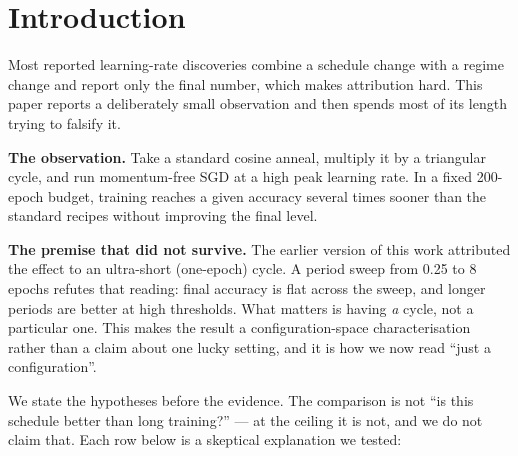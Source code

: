 \documentclass[11pt,a4paper]{article}
\begin{document}
\section{Introduction}
Most reported learning-rate discoveries combine a schedule change with a regime change and report only the final number, which makes attribution hard. This paper reports a deliberately small observation and then spends most of its length trying to falsify it.

\textbf{The observation.} Take a standard cosine anneal, multiply it by a triangular cycle, and run momentum-free SGD at a high peak learning rate. In a fixed 200-epoch budget, training reaches a given accuracy several times sooner than the standard recipes without improving the final level.

\textbf{The premise that did not survive.} The earlier version of this work attributed the effect to an ultra-short (one-epoch) cycle. A period sweep from 0.25 to 8 epochs refutes that reading: final accuracy is flat across the sweep, and longer periods are better at high thresholds. What matters is having \textit{a} cycle, not a particular one. This makes the result a configuration-space characterisation rather than a claim about one lucky setting, and it is how we now read ``just a configuration''.

We state the hypotheses before the evidence. The comparison is not ``is this schedule better than long training?'' --- at the ceiling it is not, and we do not claim that. Each row below is a skeptical explanation we tested:
\end{document}
